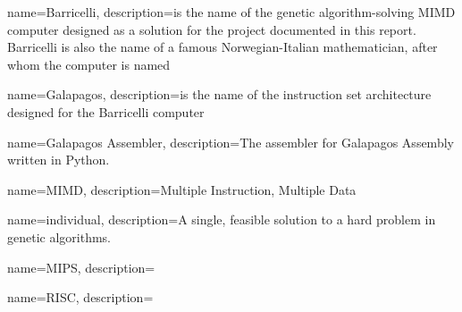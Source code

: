 {
name=Barricelli,
description={is the name of the genetic algorithm-solving MIMD computer designed as a solution for the project documented in this report. Barricelli is also the name of a famous Norwegian-Italian mathematician, after whom the computer is named}
}

{
name=Galapagos,
description={is the name of the instruction set architecture designed for the Barricelli computer}
}

{
name=Galapagos Assembler,
description={The assembler for Galapagos Assembly written in Python.}
}

{
name=MIMD,
description={Multiple Instruction, Multiple Data}
}

{
name=individual,
description={A single, feasible solution to a hard problem in genetic algorithms.}
}

{
name=MIPS,
description={}
}

{
name=RISC,
description={}
}
